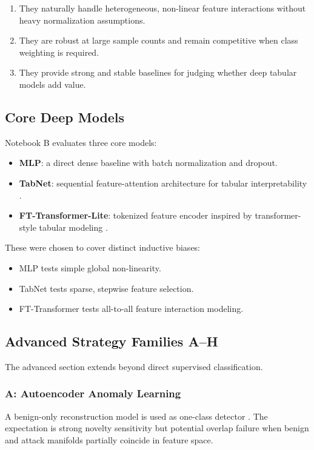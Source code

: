 \documentclass[10pt,journal]{IEEEtran}
\begin{document}
\begin{enumerate}
\item They naturally handle heterogeneous, non-linear feature interactions without heavy normalization assumptions.
\item They are robust at large sample counts and remain competitive when class weighting is required.
\item They provide strong and stable baselines for judging whether deep tabular models add value.
\end{enumerate}

\subsection{Core Deep Models}
Notebook B evaluates three core models:

\begin{itemize}
\item \textbf{MLP}: a direct dense baseline with batch normalization and dropout.
\item \textbf{TabNet}: sequential feature-attention architecture for tabular interpretability \cite{arik2021tabnet}.
\item \textbf{FT-Transformer-Lite}: tokenized feature encoder inspired by transformer-style tabular modeling \cite{gorishniy2021revisiting}.
\end{itemize}

These were chosen to cover distinct inductive biases:

\begin{itemize}
\item MLP tests simple global non-linearity.
\item TabNet tests sparse, stepwise feature selection.
\item FT-Transformer tests all-to-all feature interaction modeling.
\end{itemize}

\subsection{Advanced Strategy Families A--H}
The advanced section extends beyond direct supervised classification.

\subsubsection{A: Autoencoder Anomaly Learning}
A benign-only reconstruction model is used as one-class detector \cite{hinton2006reducing}. The expectation is strong novelty sensitivity but potential overlap failure when benign and attack manifolds partially coincide in feature space.
\end{document}
